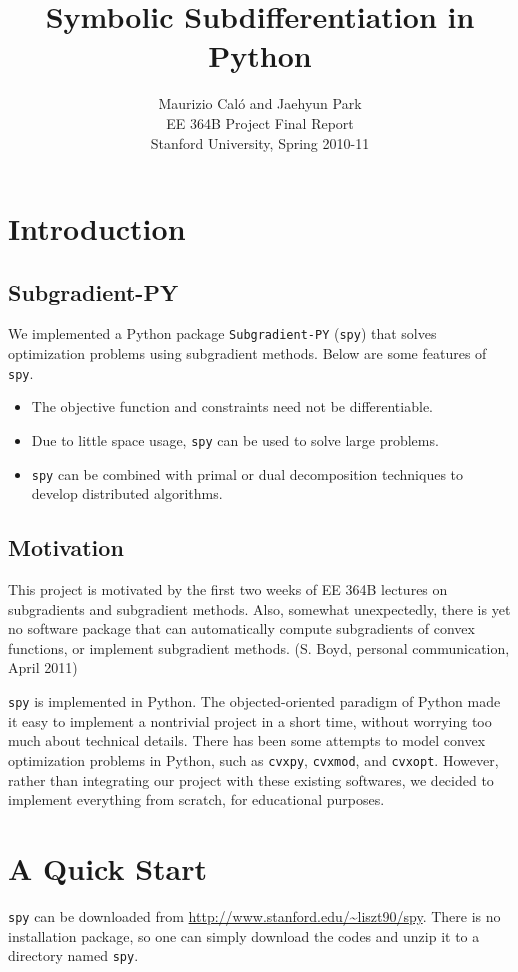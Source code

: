 \documentclass[12pt]{article}
\title{Symbolic Subdifferentiation in Python}
\author{Maurizio Cal\'o and Jaehyun Park\\
EE 364B Project Final Report\\
Stanford University, Spring 2010-11}
\begin{document}
\maketitle

\section{Introduction}
\subsection{Subgradient-PY}
We implemented a Python package \verb'Subgradient-PY' (\verb'spy') that solves
optimization problems using subgradient methods. Below are some features of \verb'spy'.
\begin{itemize}
\item The objective function and constraints need not be differentiable.
\item Due to little space usage, \verb'spy' can be used to solve large problems.
\item \verb'spy' can be combined with primal or dual decomposition techniques to develop distributed algorithms.
\end{itemize}

\subsection{Motivation}
This project is motivated by the first two weeks of EE 364B lectures on subgradients and subgradient methods. Also, somewhat unexpectedly, there is yet no software package that can automatically compute subgradients of convex functions, or implement subgradient methods. (S. Boyd, personal communication, April 2011)

\verb'spy' is implemented in Python. The objected-oriented paradigm of Python made it easy to implement a nontrivial project in a short time, without worrying too much about technical details. There has been some attempts to model convex optimization problems in Python, such as \verb'cvxpy', \verb'cvxmod', and \verb'cvxopt'. However, rather than integrating our project with these existing softwares, we decided to implement everything from scratch, for educational purposes.

\section{A Quick Start}
\verb'spy' can be downloaded from \url{http://www.stanford.edu/~liszt90/spy}. There is no installation package, so one can simply download the codes and unzip it to a directory named \verb'spy'.
\end{document}
